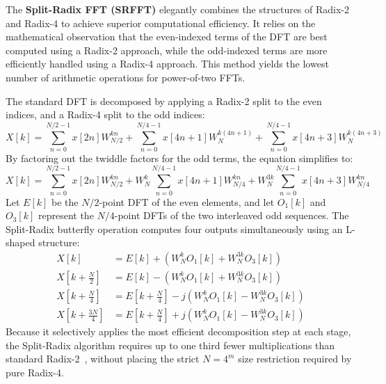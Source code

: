 The \textbf{Split-Radix FFT (SRFFT)} elegantly combines the structures of Radix-2 and Radix-4 to achieve superior computational efficiency. It relies on the mathematical observation that the even-indexed terms of the DFT are best computed using a Radix-2 approach, while the odd-indexed terms are more efficiently handled using a Radix-4 approach. This method yields the lowest number of arithmetic operations for power-of-two FFTs.

The standard DFT is decomposed by applying a Radix-2 split to the even indices, and a Radix-4 split to the odd indices:
\begin{equation}
    X[k] = \sum_{n=0}^{N/2-1} x[2n] W_{N/2}^{kn} + \sum_{n=0}^{N/4-1} x[4n+1] W_N^{k(4n+1)} + \sum_{n=0}^{N/4-1} x[4n+3] W_N^{k(4n+3)}
\end{equation}
By factoring out the twiddle factors for the odd terms, the equation simplifies to:
\begin{equation}
    X[k] = \sum_{n=0}^{N/2-1} x[2n] W_{N/2}^{kn} + W_N^k \sum_{n=0}^{N/4-1} x[4n+1] W_{N/4}^{kn} + W_N^{3k} \sum_{n=0}^{N/4-1} x[4n+3] W_{N/4}^{kn}
\end{equation}
Let $E[k]$ be the $N/2$-point DFT of the even elements, and let $O_1[k]$ and $O_3[k]$ represent the $N/4$-point DFTs of the two interleaved odd sequences. The Split-Radix butterfly operation computes four outputs simultaneously using an L-shaped structure:
\begin{align}
    X[k] &= E[k] + \left( W_N^k O_1[k] + W_N^{3k} O_3[k] \right) \\
    X\left[k + \frac{N}{2}\right] &= E[k] - \left( W_N^k O_1[k] + W_N^{3k} O_3[k] \right) \\
    X\left[k + \frac{N}{4}\right] &= E\left[k + \frac{N}{4}\right] - j \left( W_N^k O_1[k] - W_N^{3k} O_3[k] \right) \\
    X\left[k + \frac{3N}{4}\right] &= E\left[k + \frac{N}{4}\right] + j \left( W_N^k O_1[k] - W_N^{3k} O_3[k] \right)
\end{align}
Because it selectively applies the most efficient decomposition step at each stage, the Split-Radix algorithm requires up to one third fewer multiplications than standard Radix-2~\cite{duhamel1984}, without placing the strict $N=4^m$ size restriction required by pure Radix-4.

